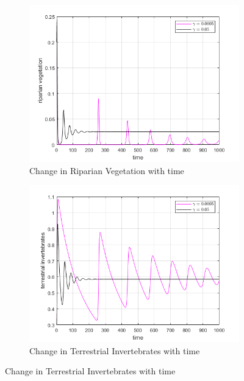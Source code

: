 \documentclass[12pt]{article}
\numberwithin{equation}{section}
\begin{document}
\FloatBarrier
\begin{figure}[bp!]
	\centering
        \caption{Variation in parameter $\gamma$}
	\begin{subfigure}[t]{0.45\textwidth}
		\centering
	\includegraphics[width=\textwidth]{time_vs_riparian_gamma.png}
		\caption{Change in Riparian Vegetation with time} \label{fig:time_vs_riparian_gamma}
	\end{subfigure}
\hspace{0.08\textwidth}
        \begin{subfigure}[t]{0.45\textwidth}
                 \centering
         \includegraphics[width=\textwidth]{time_vs_invertebrates_gamma.png}
		\caption{Change in Terrestrial Invertebrates with time} \label{fig:time_vs_invertebrates_gamma}

\end{subfigure}
\end{figure}
\end{document}
